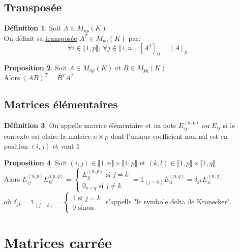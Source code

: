 \documentclass[10pt,a4paper]{article}
\theoremstyle{definition}
\newtheorem{proposition}{Proposition}[section]
\newtheorem{definition}[proposition]{Définition}
\begin{document}
\subsection{Transposée}
\begin{definition}
Soit $A \in M_{np}(K)$ \\
On définit sa \uline{transposée} $A^T \in M_{pn}(K)$ par:
\[ \forall i \in \llbracket 1,p \rrbracket ,\, \forall j \in \llbracket 1, n \rrbracket ,\, [A^T]_{ij} = [A]_{ji} \]
\end{definition}
\begin{proposition}
Soit $A \in M_{np}(K)$ et $B \in M_{pq}(K)$ \\
Alors $(AB)^T = B^T A^T$
\end{proposition}

\subsection{Matrices élémentaires}
\begin{definition}
On appelle matrice élémentaire et on note $E_{ij}^{(n, p)}$ ou $E_{ij}$ si le contexte est claire la matrice $n \times p$ dont l'unique coefficient non nul est en position $(i, j)$ et vaut $1$
\end{definition}
\begin{proposition}
Soit $(i, j) \in \llbracket1, n \rrbracket \times \llbracket 1, p \rrbracket$ et $(k, l) \in \llbracket 1, p \rrbracket \times \llbracket 1, q \rrbracket$ \\
Alors $E_{ij}^{(n, p)} E_{kl}^{(p, q)} = \begin{cases}
E_{il}^{(n, p)} \text{ si } j = k \\
0_{n \times q} \text{ si } j \neq k
\end{cases} = \mathds{1}_{(j = k)} E_{il}^{(n, q)} = \delta_{jk} E_{il}^{(n, q)} $ \\
où $\delta_{jk} = \mathds{1}_{(j = k)} = \begin{cases}
1 \text{ si } j = k \\
0 \text{ sinon}
\end{cases}$ s'appelle "le symbole delta de Kronecker".
\end{proposition}

\section{Matrices carrée}
\end{document}
